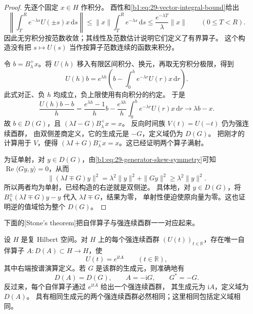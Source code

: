 \begin{proof}
先逐个固定 \(x\in H\) 作积分。
酉性和\eqref{b1:eq:29-vector-integral-bound}给出
\[
 \left\|\int_T^R e^{-\lambda s}U(\pm s)x\,\mathrm ds\right\|
 \leq\|x\|\int_T^R e^{-\lambda s}\,\mathrm ds
 \leq\frac{e^{-\lambda T}}{\lambda}\|x\|
 \qquad(0\leq T<R).
\]
因此无穷积分按范数收敛；其线性及范数估计说明它们定义了有界算子。
这个构造没有把 \(s\mapsto U(s)\) 当作按算子范数连续的函数来积分。

令 \(b=B_\lambda^+x\)。将 \(U(h)\) 移入有限区间积分、换元，再取无穷积分极限，得到
\[
 U(h)b=e^{\lambda h}
       \left(b-\int_0^h e^{-\lambda r}U(r)x\,\mathrm dr\right).
\]
此式对正、负 \(h\) 均成立，负上限使用有向积分的约定。
于是
\[
 \frac{U(h)b-b}{h}
 =\frac{e^{\lambda h}-1}{h}b
  -\frac{e^{\lambda h}}{h}
   \int_0^h e^{-\lambda r}U(r)x\,\mathrm dr
 \longrightarrow\lambda b-x.
\]
故 \(b\in D(G)\)，且 \((\lambda I-G)B_\lambda^+x=x\)。
反向时间族 \(V(t)=U(-t)\) 仍为强连续酉群，
由双侧差商定义，它的生成元是 \(-G\)，定义域仍为 \(D(G)\)。
把刚才的计算用于 \(V\)，便得
\((\lambda I+G)B_\lambda^-x=x\)。这已经证明两个算子满射。

为证单射，对 \(y\in D(G)\)，由\eqref{b1:eq:29-generator-skew-symmetry}可知
\(\operatorname{Re}\langle Gy,y\rangle=0\)，从而
\[
 \|(\lambda I\mp G)y\|^2
 =\lambda^2\|y\|^2+\|Gy\|^2
 \geq\lambda^2\|y\|^2.
\]
所以两者均为单射，已经构造的右逆就是双侧逆。
具体地，对 \(y\in D(G)\)，将
\(B_\lambda^\pm(\lambda I\mp G)y-y\) 代入 \(\lambda I\mp G\)，结果为零，
单射性便迫使原向量为零。这也证明逆的值域恰为整个 \(D(G)\)。
\end{proof}

下面的[Stone's theorem]把自伴算子与强连续酉群一一对应起来。

\begin{theorem}[Stone]
\label{b1:thm:29-stone}
设 \(H\) 是复 Hilbert 空间。对 \(H\) 上的每个强连续酉群
\((U(t))_{t\in\mathbb R}\)，存在唯一自伴算子
\(A:D(A)\subset H\to H\)，使
\[
 U(t)=e^{\mathrm itA}\qquad(t\in\mathbb R),
\]
其中右端按谱演算定义。若 \(G\) 是该群的生成元，则准确地有
\[
 D(A)=D(G),\qquad A=-\mathrm iG,\qquad G^*=-G.
\]
反过来，每个自伴算子通过 \(e^{\mathrm itA}\) 给出一个强连续酉群，
其生成元为 \(\mathrm iA\)，定义域为 \(D(A)\)。
具有相同生成元的两个强连续酉群必然相同；这里相同包括定义域相同。
\end{theorem}

